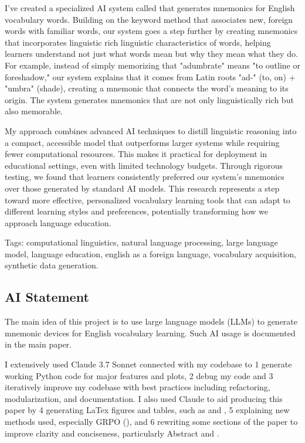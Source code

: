 I've created a specialized AI system called \linksys that generates mnemonics for English vocabulary words. Building on the keyword method that associates new, foreign words with familiar words, our system goes a step further by creating mnemonics that incorporates linguistic rich linguistic characteristics of words, helping learners understand not just what words mean but why they mean what they do. For example, instead of simply memorizing that "adumbrate" means "to outline or foreshadow," our system explains that it comes from Latin roots "ad-" (to, on) + "umbra" (shade), creating a mnemonic that connects the word's meaning to its origin. The system generates mnemonics that are not only linguistically rich but also memorable.

My approach combines advanced AI techniques to distill linguistic reasoning into a compact, accessible model that outperforms larger systems while requiring fewer computational resources. This makes it practical for deployment in educational settings, even with limited technology budgets. Through rigorous testing, we found that learners consistently preferred our system's mnemonics over those generated by standard AI models. This research represents a step toward more effective, personalized vocabulary learning tools that can adapt to different learning styles and preferences, potentially transforming how we approach language education.

Tags: computational linguistics, natural language processing, large language model, language education, english as a foreign language, vocabulary acquisition, synthetic data generation.

\subsection*{AI Statement} \label{sec:ai-statement}

The main idea of this project is to use large language models (LLMs) to generate mnemonic devices for English vocabulary learning. Such AI usage is documented in the main paper.

I extensively used Claude 3.7 Sonnet connected with my codebase to \numlist{1} generate working Python code for major features and plots, \numlist{2} debug my code and \numlist{3} iteratively improve my codebase with best practices including refactoring, modularization, and documentation. I also used Claude to aid producing this paper by \numlist{4} generating LaTex figures and tables, such as  and , \numlist{5} explaining new methods used, especially GRPO (), and \numlist{6} rewriting some sections of the paper to improve clarity and conciseness, particularly Abstract and .

